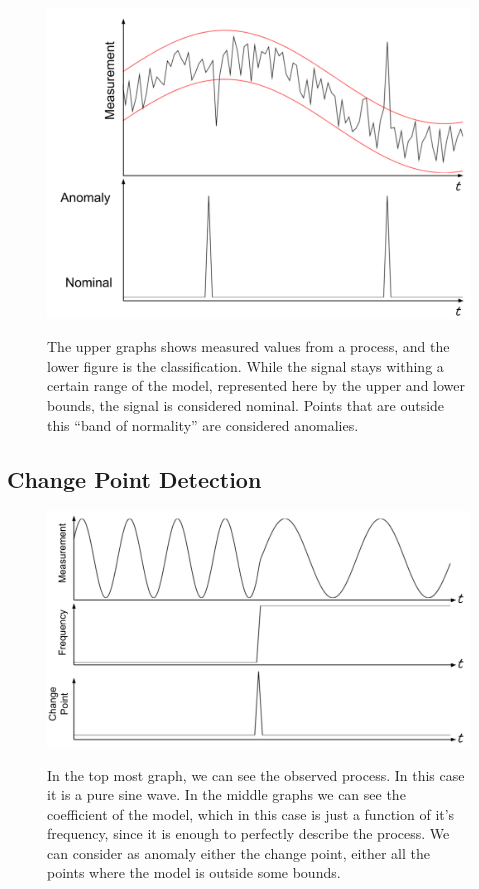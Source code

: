 \documentclass[a4paper, 10pt]{article}
\begin{document}
\begin{figure}
\centering
\includegraphics[width=\textwidth]{Outlier}
\label{fig:outlier}
\caption{The upper graphs shows measured values from a process, and the lower figure is the classification. While the signal stays withing a certain range of the model, represented here by the upper and lower bounds, the signal is considered nominal. Points that are outside this ``band of normality'' are considered anomalies.}
\end{figure}

\subsection{Change Point Detection}

\begin{figure}
    \centering
    \includegraphics[width=\textwidth]{ChangePoint}
    \label{fig:changepoint}
    \caption{In the top most graph, we can see the observed process. In this case it is a pure sine wave. In the middle graphs we can see the coefficient of the model, which in this case is just a function of it's frequency, since it is enough to perfectly describe the process. We can consider as anomaly either the change point, either all the points where the model is outside some bounds.}
\end{figure}
\end{document}
